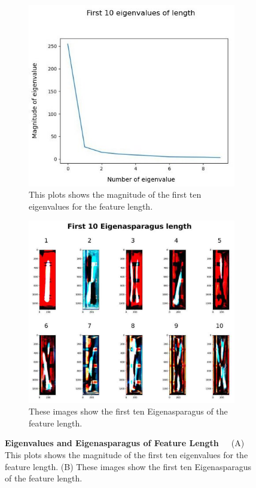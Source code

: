 \begin{figure}[!h]
	\centering
	\begin{subfigure}{0.7\textwidth}
		\includegraphics[width=0.9\linewidth]{Figures/chapter04/pca_length_graph.png} 
		\caption{This plots shows the magnitude of the first ten eigenvalues for the feature length.}
	\end{subfigure}
	\vspace{20pt}
	
	\begin{subfigure}{0.9\textwidth}
		\includegraphics[width=0.9\linewidth]{Figures/chapter04/pca_length.png}
		\caption{These images show the first ten Eigenasparagus of the feature length.}
	\end{subfigure}
	\caption[First Ten Eigenvalues and Eigenasparagus of Feature Length]{\textbf{Eigenvalues and Eigenasparagus of Feature Length}~~~(A) This plots shows the magnitude of the first ten eigenvalues for the feature length. (B) These images show the first ten Eigenasparagus of the feature length.}
    \label{fig:PCAlength}
\end{figure}


